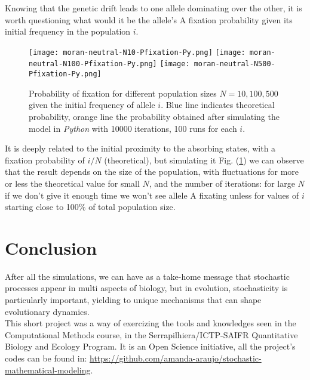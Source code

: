 \documentclass[12pt]{article}
\begin{document}
\indent Knowing that the genetic drift leads to one allele dominating over the other, it is worth questioning what would it be the allele's A fixation probability given its initial frequency in the population $i$. 
\begin{figure}[H]
  \texttt{[image: moran-neutral-N10-Pfixation-Py.png]}
\endminipage\hfill
{}
  \texttt{[image: moran-neutral-N100-Pfixation-Py.png]}
\endminipage\hfill
{}%
  \texttt{[image: moran-neutral-N500-Pfixation-Py.png]}
\endminipage
\caption{Probability of fixation for different population sizes $N = 10, 100, 500$ given the initial frequency of allele $i$. Blue line indicates theoretical probability, orange line the probability obtained after  
simulating the model in \textit{Python} with 10000 iterations, 100 runs for each $i$.}
\label{fig:oi}
\end{figure}
\indent It is deeply related to the initial proximity to the absorbing states, with a fixation probability of $i/N$ (theoretical), but simulating it Fig. (\ref{fig:oi}) we can observe that the result depends on the size of the population, with fluctuations for more or less the theoretical value for small $N$, and the number of iterations: for large $N$ if we don't give it enough time we won't see allele A fixating unless for values of $i$ starting close to 100\% of total population size.

\section{Conclusion}
\indent After all the simulations, we can have as a take-home message that stochastic processes appear in multi aspects of biology, but in evolution, stochasticity is particularly important, yielding to unique mechanisms that can shape evolutionary dynamics.\\
\indent This short project was a way of exercizing the tools and knowledges seen in the Computational Methods course, in the Serrapilhiera/ICTP-SAIFR Quantitative Biology and Ecology Program. It is an Open Science initiative, all the project's codes can be found in: \url{https://github.com/amanda-araujo/stochastic-mathematical-modeling}.




\end{document}
